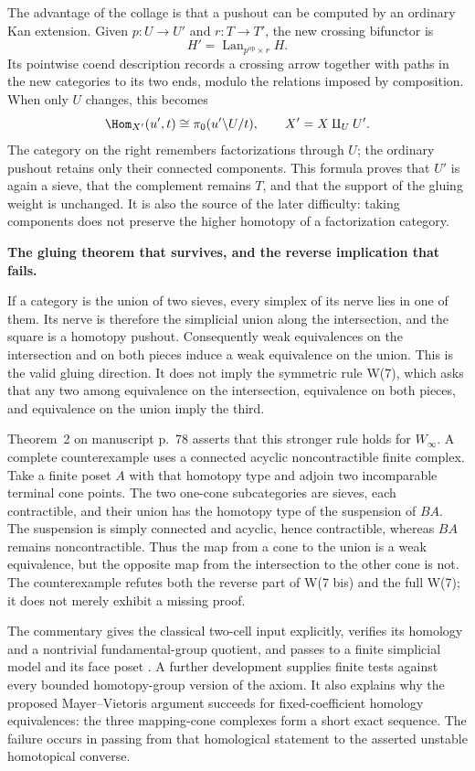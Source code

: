 The advantage of the collage is that a pushout can be computed by an ordinary Kan extension. Given $p:U\to U'$ and $r:T\to T'$, the new crossing bifunctor is
\[
 H'=\operatorname{Lan}_{p^{\mathrm{op}}\times r}H.
\]
Its pointwise coend description records a crossing arrow together with paths in the new categories to its two ends, modulo the relations imposed by composition. When only $U$ changes, this becomes
\[
 \Hom_{X'}(u',t)\cong\pi_0(u'\backslash U/t),
 \qquad X'=X\amalg_U U'.
\]
The category on the right remembers factorizations through $U$; the ordinary pushout retains only their connected components. This formula proves that $U'$ is again a sieve, that the complement remains $T$, and that the support of the gluing weight is unchanged. It is also the source of the later difficulty: taking components does not preserve the higher homotopy of a factorization category.

\medskip
{}
\noindent\textbf{The gluing theorem that survives, and the reverse implication that fails.}

If a category is the union of two sieves, every simplex of its nerve lies in one of them. Its nerve is therefore the simplicial union along the intersection, and the square is a homotopy pushout. Consequently weak equivalences on the intersection and on both pieces induce a weak equivalence on the union. This is the valid gluing direction. It does not imply the symmetric rule W(7), which asks that any two among equivalence on the intersection, equivalence on both pieces, and equivalence on the union imply the third.

Theorem~2 on manuscript p.~78 asserts that this stronger rule holds for $W_\infty$. A complete counterexample uses a connected acyclic noncontractible finite complex. Take a finite poset $A$ with that homotopy type and adjoin two incomparable terminal cone points. The two one-cone subcategories are sieves, each contractible, and their union has the homotopy type of the suspension of $BA$. The suspension is simply connected and acyclic, hence contractible, whereas $BA$ remains noncontractible. Thus the map from a cone to the union is a weak equivalence, but the opposite map from the intersection to the other cone is not. The counterexample refutes both the reverse part of W(7 bis) and the full W(7); it does not merely exhibit a missing proof.

The commentary gives the classical two-cell input explicitly, verifies its homology and a nontrivial fundamental-group quotient, and passes to a finite simplicial model and its face poset \citep[Example~2.38 and Theorem~2C.5]{Hatcher2002}. A further development supplies finite tests against every bounded homotopy-group version of the axiom. It also explains why the proposed Mayer--Vietoris argument succeeds for fixed-coefficient homology equivalences: the three mapping-cone complexes form a short exact sequence. The failure occurs in passing from that homological statement to the asserted unstable homotopical converse.

